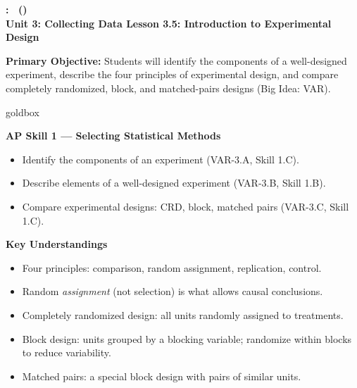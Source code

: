 \documentclass[10pt]{article}
\newcommand{\UnitNumberName}{Unit 3: Collecting Data \quad}
\newcommand{\LessonNumberName}{Lesson 3.5: Introduction to Experimental Design}
\begin{document}
\begin{center}
    {\Large\bfseries \CourseName: \SchoolYear\ (\MeetingLength) \\
    {\small\bfseries \UnitNumberName \LessonNumberName}}
\end{center}

\begin{tcolorbox}[colback=sky, colframe=navy, boxrule=0.9pt, arc=2mm,
    left=2mm, right=2mm, top=1.5mm, bottom=1.5mm]
    \textbf{Primary Objective:} Students will identify the components of a well-designed
    experiment, describe the four principles of experimental design, and compare
    completely randomized, block, and matched-pairs designs (Big Idea: VAR).
\end{tcolorbox}

\renewcommand{\arraystretch}{1.6}
\begin{skillbox}{goldbox}
\begin{minipage}[t]{0.48\linewidth}
    \textbf{AP Skill 1 --- Selecting Statistical Methods}
    \begin{itemize}
        \item Identify the components of an experiment (VAR-3.A, Skill 1.C).
        \item Describe elements of a well-designed experiment (VAR-3.B, Skill 1.B).
        \item Compare experimental designs: CRD, block, matched pairs (VAR-3.C,
              Skill 1.C).
    \end{itemize}
\end{minipage}
\hfill
\begin{minipage}[t]{0.48\linewidth}
    \textbf{Key Understandings}
    \begin{itemize}
        \item Four principles: comparison, random assignment, replication, control.
        \item Random \emph{assignment} (not selection) is what allows causal conclusions.
        \item Completely randomized design: all units randomly assigned to treatments.
        \item Block design: units grouped by a blocking variable; randomize within
              blocks to reduce variability.
        \item Matched pairs: a special block design with pairs of similar units.
    \end{itemize}
\end{minipage}
\end{skillbox}
\end{document}
